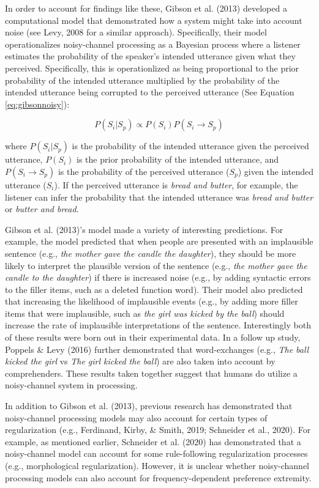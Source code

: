 \documentclass[10pt, letterpaper]{article}
\begin{document}
In order to account for findings like these, Gibson et al. (2013)
developed a computational model that demonstrated how a system might
take into account noise (see Levy, 2008 for a similar approach).
Specifically, their model operationalizes noisy-channel processing as a
Bayesian process where a listener estimates the probability of the
speaker's intended utterance given what they perceived. Specifically,
this is operationlized as being proportional to the prior probability of
the intended utterance multiplied by the probability of the intended
utterance being corrupted to the perceived utterance (See Equation
\ref{eq:gibsonnoisy}):

\begin{equation}
\label{eq:gibsonnoisy}
P(S_i|S_p) \propto P(S_i) P(S_i \to S_p)
\end{equation}

\noindent where \(P(S_i|S_p)\) is the probability of the intended
utterance given the perceived utterance, \(P(S_i)\) is the prior
probability of the intended utterance, and \(P(S_i \to S_p)\) is the
probability of the perceived utterance (\(S_p\)) given the intended
utterance (\(S_i\)). If the perceived utterance is \emph{bread and
butter}, for example, the listener can infer the probability that the
intended utterance was \emph{bread and butter} or \emph{butter and
bread}.

Gibson et al. (2013)'s model made a variety of interesting predictions.
For example, the model predicted that when people are presented with an
implausible sentence (e.g., \emph{the mother gave the candle the
daughter}), they should be more likely to interpret the plausible
version of the sentence (e.g., \emph{the mother gave the candle to the
daughter}) if there is increased noise (e.g., by adding syntactic errors
to the filler items, such as a deleted function word). Their model also
predicted that increasing the likelihood of implausible events (e.g., by
adding more filler items that were implausible, such as \emph{the girl
was kicked by the ball}) should increase the rate of implausible
interpretations of the sentence. Interestingly both of these results
were born out in their experimental data. In a follow up study, Poppels
\& Levy (2016) further demonstrated that word-exchanges (e.g., \emph{The
ball kicked the girl} vs \emph{The girl kicked the ball}) are also taken
into account by comprehenders. These results taken together suggest that
humans do utilize a noisy-channel system in processing.

In addition to Gibson et al. (2013), previous research has demonstrated
that noisy-channel processing models may also account for certain types
of regularization (e.g., Ferdinand, Kirby, \& Smith, 2019; Schneider et
al., 2020). For example, as mentioned earlier, Schneider et al. (2020)
has demonstrated that a noisy-channel model can account for some
rule-following regularization processes (e.g., morphological
regularization). However, it is unclear whether noisy-channel processing
models can also account for frequency-dependent preference extremity.
\end{document}
